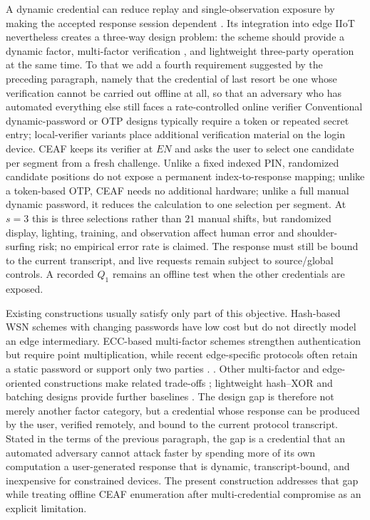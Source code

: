 \documentclass[cmc,article,submit,moreauthors,pdftex]{Definitions/tsp}
\providecommand{\DIFadd}[1]{{\protect\color{blue} \sf #1}} %
\providecommand{\DIFdel}[1]{{\protect\color{red} \scriptsize #1}} %
\providecommand{\DIFaddbegin}{} %
\providecommand{\DIFaddend}{} %
\providecommand{\DIFdelbegin}{} %
\providecommand{\DIFdelend}{} %
\begin{document}
A dynamic credential can reduce replay and single-observation exposure by making the accepted response session dependent \cite{kong}. \DIFdelbegin \DIFdel{Its integration into edge IIoT nevertheless creates a three-way design problem: the scheme should provide a dynamic factor, multi-factor verification , and lightweight three-party operation at the same time. To that we add a fourth requirement suggested by the preceding paragraph, namely that the credential of last resort be one whose verification cannot be carried out offline at all, so that an adversary who has automated everything else still faces a rate-controlled online verifier}\DIFdelend \DIFaddbegin \DIFadd{Conventional dynamic-password or OTP designs typically require a token or repeated secret entry; local-verifier variants place additional verification material on the login device. CEAF keeps its verifier at $EN$ and asks the user to select one candidate per segment from a fresh challenge. Unlike a fixed indexed PIN, randomized candidate positions do not expose a permanent index-to-response mapping; unlike a token-based OTP, CEAF needs no additional hardware; unlike a full manual dynamic password, it reduces the calculation to one selection per segment. At $s=3$ this is three selections rather than $21$ manual shifts, but randomized display, lighting, training, and observation affect human error and shoulder-surfing risk; no empirical error rate is claimed. The response must still be bound to the current transcript, and live requests remain subject to source/global controls. A recorded $Q_1$ remains an offline test when the other credentials are exposed}\DIFaddend .

Existing constructions usually satisfy only part of this objective. Hash-based WSN schemes with changing passwords have low cost but do not directly model an edge intermediary. ECC-based multi-factor schemes strengthen authentication but require point multiplication, while recent edge-specific protocols often retain a static password or support only two parties \DIFdelbegin \DIFdel{\cite{yusuf,chen,turkanovic2013,amin,li2018threefactor,azrour,li2018ecc,xu,cui,shang}. }\DIFdelend \DIFaddbegin \DIFadd{\cite{yusuf,chen,turkanovic2013}. Other multi-factor and edge-oriented constructions make related trade-offs \cite{amin,li2018threefactor,li2018ecc}; lightweight hash--XOR and batching designs provide further baselines \cite{xu,cui,shang}. }\DIFaddend The design gap is \DIFdelbegin \DIFdel{therefore not merely another factor category, but a credential whose response can be produced by the user, verified remotely, and bound to the current protocol transcript. Stated in the terms of the previous paragraph, the gap is a credential that an automated adversary cannot attack faster by spending more of its own computation}\DIFdelend \DIFaddbegin \DIFadd{a user-generated response that is dynamic, transcript-bound, and inexpensive for constrained devices. The present construction addresses that gap while treating offline CEAF enumeration after multi-credential compromise as an explicit limitation}\DIFaddend .
\end{document}
